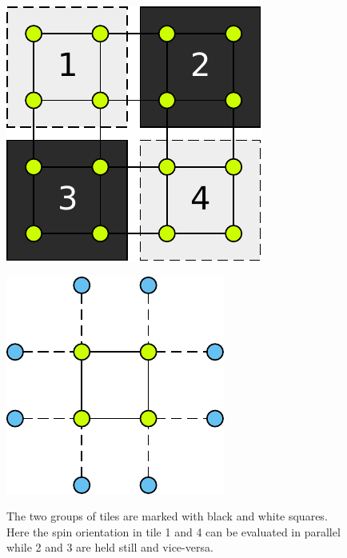 \documentclass[paper=a4, fontsize=11pt]{scrartcl} %
\numberwithin{equation}{section} %
\numberwithin{figure}{section} %
\numberwithin{table}{section} %
\begin{document}
\begin{figure}
\centering
\begin{minipage}{.65\textwidth}
  \centering
  \includegraphics[width=.5\linewidth]{images/4x4.pdf}
  \caption{The two groups of tiles are marked with black and white squares. Here the spin orientation in tile 1 and 4 can be evaluated in parallel while 2 and 3 are held still and vice-versa.}
  \label{fig:checker_grid}
\end{minipage}
\hspace{0.05\linewidth}
\begin{minipage}{.25\textwidth}
  \centering
  \includegraphics[width=1\linewidth]{images/2D_ghosts.pdf}
  \label{fig:gost_cells}
\end{minipage}
\end{figure}
\end{document}
